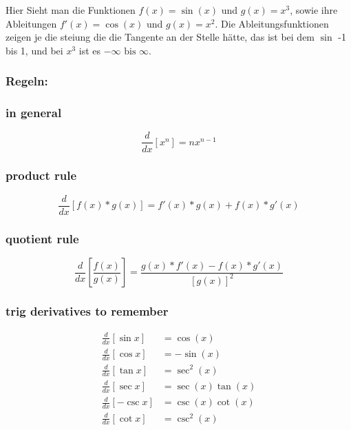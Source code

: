 \documentclass{report}
\begin{document}
\clearpage


Hier Sieht man die Funktionen $f(x)=\sin(x)$ und $g(x)=x^3$, sowie ihre
Ableitungen $f'(x)=\cos(x)$ und $g(x)=x^2$.
Die Ableitungsfunktionen zeigen je die steiung die die Tangente an der Stelle
hätte, das ist bei dem $\sin$ -1 bis 1, und bei $x^3$ ist es $-\infty\text{ bis }\infty$.

\subsubsection{Regeln:}
\subsubsection{in general}
\[\frac{d}{dx}[x^n] = nx^{n-1}\]

\subsubsection{product rule}
\[\frac{d}{dx}\left[f(x)*g(x)\right]=f'(x)*g(x)+f(x)*g'(x)\]

\subsubsection{quotient rule}
\[\frac{d}{dx} \left[\frac{f(x)}{g(x)}\right]=
\frac{g(x)*f'(x)-f(x)*g'(x)}{[g(x)]^2}\]

\subsubsection{trig derivatives to remember}
\begin{align*}
    \frac{d}{dx}[\sin x]&=\cos (x)\\
    \frac{d}{dx}[\cos x]&=-\sin(x)\\
    \frac{d}{dx}[\tan x]&=\sec^2 (x)\\
    \frac{d}{dx}[\sec x]&=\sec(x)\tan(x)\\
    \frac{d}{dx}[-\csc x]&=\csc(x)\cot(x)\\
    \frac{d}{dx}[\cot x]&=\csc^2(x)\\
\end{align*}
\end{document}

